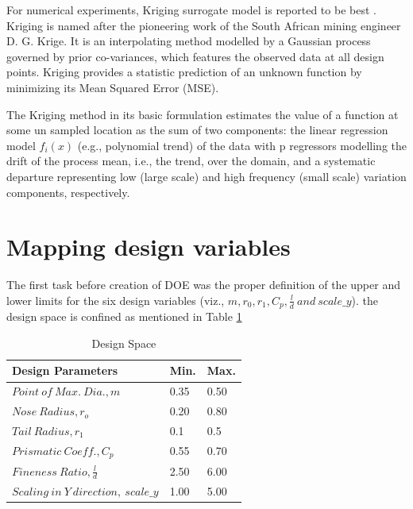 For numerical experiments, Kriging surrogate model is reported to be best . Kriging is named after the pioneering work of the South African mining engineer D. G. Krige. It is an interpolating method modelled by a Gaussian process governed by prior co-variances, which features the observed data at all design points. Kriging provides a statistic prediction of an unknown function by minimizing its Mean Squared Error (MSE).

The Kriging method in its basic formulation estimates the value of a function at some un sampled location as the sum of two components: the linear regression model $ f_i (x) $ (e.g., polynomial trend) of the data with p regressors modelling the drift of the process mean, i.e., the trend, over the domain, and a systematic departure representing low (large scale) and high frequency (small scale) variation components, respectively.

\section{Mapping design variables}
The first task before creation of DOE was the proper definition of the upper and lower limits for the six design variables (viz., $ m, r_0, r_1, C_p, \frac{l}{d} \ and \  scale \_y $). the design space is confined as mentioned in Table \ref{Degign space }

\begin{table}[H]
	\centering
	\caption{Design Space}
	\label{Degign space }
	\begin{tabular}{lll}
		\hline \hline
		Design Parameters & Min. & Max.    \\ \hline \hline
		
		$ Point\ of\ Max.\ Dia., m$ & 0.35 & 0.50     \\  
		$ Nose\ Radius, r _{o} $ & 0.20 & 0.80     \\
		$ Tail\ Radius, r _{1} $ & 0.1 & 0.5     \\  
		$ Prismatic\ Coeff., C _{p }$ & 0.55 & 0.70 \\
		$ Fineness\ Ratio, \frac{l}{d} $ &2.50 & 6.00 \\
		$Scaling\ in\ Y\ direction,\ scale\_y$ &1.00 & 5.00\\ \hline \hline
	\end{tabular}
\end{table}

